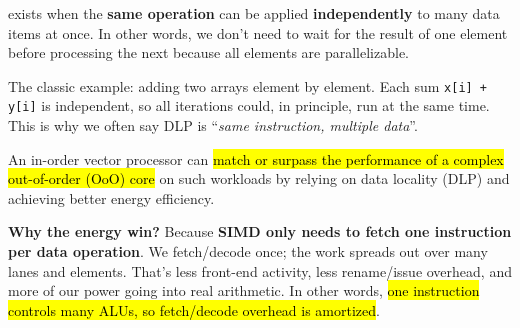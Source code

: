 \highspace
{} exists when the \textbf{same operation} can be applied \textbf{independently} to many data items at once. In other words, we don't need to wait for the result of one element before processing the next because all elements are parallelizable.

\highspace
The classic example: adding two arrays element by element. Each sum \texttt{x[i] + y[i]} is independent, so all iterations could, in principle, run at the same time. This is why we often say DLP is ``\emph{same instruction, multiple data}''.

\highspace
An in-order vector processor can \hl{match or surpass the performance of a complex out-of-order (OoO) core} on such workloads by relying on data locality (DLP) and achieving better energy efficiency.

\highspace
\textcolor{Green3}{ \textbf{Why the energy win?}} Because \textbf{SIMD only needs to fetch one instruction per data operation}. We fetch/decode once; the work spreads out over many lanes and elements. That's less front-end activity, less rename/issue overhead, and more of our power going into real arithmetic. In other words, \hl{one instruction controls many ALUs, so fetch/decode overhead is amortized}.